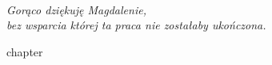 \documentclass[
  a4paper,
  justified,
  nobib,
  marginals=raggedright,
]{tufte-book}
\begin{document}
\frontmatter
\maketitle

\cleardoublepage
\thispagestyle{empty}
~\vfill
\vfill
\begin{fullwidth}
\begin{doublespace}
\raggedleft\noindent\fontsize{16}{20}\selectfont\itshape
\nohyphenation
Gorąco dziękuję Magdalenie,\\
bez wsparcia której ta praca nie zostałaby ukończona.
\end{doublespace}
\end{fullwidth}
\vfill

\tableofcontents



\mainmatter

{chapter}





\backmatter

\end{document}
